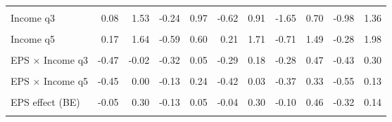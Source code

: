 \begin{table}
\begin{tabular}[t]{lrrrrrrrrrr}
\cellcolor{gray!10}{Income q2} & \cellcolor{gray!10}{-0.70} & \cellcolor{gray!10}{0.83} & \cellcolor{gray!10}{-0.68} & \cellcolor{gray!10}{0.50} & \cellcolor{gray!10}{-0.47} & \cellcolor{gray!10}{1.14} & \cellcolor{gray!10}{-1.69} & \cellcolor{gray!10}{0.71} & \cellcolor{gray!10}{-1.29} & \cellcolor{gray!10}{1.19}\\
Income q3 & 0.08 & 1.53 & -0.24 & 0.97 & -0.62 & 0.91 & -1.65 & 0.70 & -0.98 & 1.36\\
\cellcolor{gray!10}{Income q4} & \cellcolor{gray!10}{0.19} & \cellcolor{gray!10}{1.65} & \cellcolor{gray!10}{-0.10} & \cellcolor{gray!10}{1.14} & \cellcolor{gray!10}{-0.37} & \cellcolor{gray!10}{1.12} & \cellcolor{gray!10}{-1.54} & \cellcolor{gray!10}{0.82} & \cellcolor{gray!10}{-1.25} & \cellcolor{gray!10}{1.12}\\
Income q5 & 0.17 & 1.64 & -0.59 & 0.60 & 0.21 & 1.71 & -0.71 & 1.49 & -0.28 & 1.98\\
\cellcolor{gray!10}{EPS × Income q2} & \cellcolor{gray!10}{-0.25} & \cellcolor{gray!10}{0.20} & \cellcolor{gray!10}{-0.15} & \cellcolor{gray!10}{0.21} & \cellcolor{gray!10}{-0.36} & \cellcolor{gray!10}{0.13} & \cellcolor{gray!10}{-0.25} & \cellcolor{gray!10}{0.50} & \cellcolor{gray!10}{-0.36} & \cellcolor{gray!10}{0.40}\\
EPS × Income q3 & -0.47 & -0.02 & -0.32 & 0.05 & -0.29 & 0.18 & -0.28 & 0.47 & -0.43 & 0.30\\
\cellcolor{gray!10}{EPS × Income q4} & \cellcolor{gray!10}{-0.47} & \cellcolor{gray!10}{-0.02} & \cellcolor{gray!10}{-0.30} & \cellcolor{gray!10}{0.08} & \cellcolor{gray!10}{-0.28} & \cellcolor{gray!10}{0.18} & \cellcolor{gray!10}{-0.16} & \cellcolor{gray!10}{0.56} & \cellcolor{gray!10}{-0.33} & \cellcolor{gray!10}{0.40}\\
EPS × Income q5 & -0.45 & 0.00 & -0.13 & 0.24 & -0.42 & 0.03 & -0.37 & 0.33 & -0.55 & 0.13\\
\cellcolor{gray!10}{Intercept (BE)} & \cellcolor{gray!10}{-0.25} & \cellcolor{gray!10}{0.72} & \cellcolor{gray!10}{-0.28} & \cellcolor{gray!10}{0.19} & \cellcolor{gray!10}{-0.26} & \cellcolor{gray!10}{0.63} & \cellcolor{gray!10}{-0.52} & \cellcolor{gray!10}{0.98} & \cellcolor{gray!10}{-0.75} & \cellcolor{gray!10}{0.42}\\
EPS effect (BE) & -0.05 & 0.30 & -0.13 & 0.05 & -0.04 & 0.30 & -0.10 & 0.46 & -0.32 & 0.14\\
\cellcolor{gray!10}{Intercept (CA)} & \cellcolor{gray!10}{-0.49} & \cellcolor{gray!10}{0.31} & \cellcolor{gray!10}{-0.22} & \cellcolor{gray!10}{0.23} & \cellcolor{gray!10}{-0.48} & \cellcolor{gray!10}{0.30} & \cellcolor{gray!10}{-1.01} & \cellcolor{gray!10}{0.54} & \cellcolor{gray!10}{-0.56} & \cellcolor{gray!10}{0.52}\\

\end{tabular}
\end{table}
